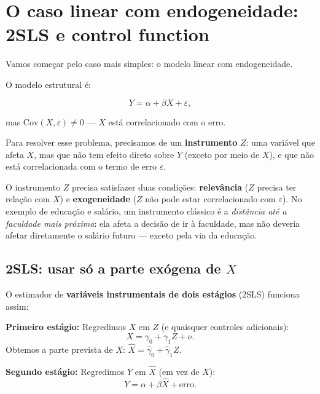 \chapter{O caso linear com endogeneidade: 2SLS e control function}

Vamos começar pelo caso mais simples: o modelo linear com endogeneidade.

O modelo estrutural é:

\begin{equation}
Y = \alpha + \beta X + \varepsilon,
\label{eq:structural}
\end{equation}

\noindent
mas $\mathrm{Cov}(X, \varepsilon) \neq 0$ --- $X$ está correlacionado com o erro.

Para resolver esse problema, precisamos de um \textbf{instrumento} $Z$: uma variável
que afeta $X$, mas que não tem efeito direto sobre $Y$ (exceto por meio de $X$), e que
não está correlacionada com o termo de erro $\varepsilon$.

\begin{destacebox}
O instrumento $Z$ precisa satisfazer duas condições: \textbf{relevância} ($Z$ precisa
ter relação com $X$) e \textbf{exogeneidade} ($Z$ não pode estar correlacionado com
$\varepsilon$). No exemplo de educação e salário, um instrumento clássico é a
\emph{distância até a faculdade mais próxima}: ela afeta a decisão de ir à faculdade,
mas não deveria afetar diretamente o salário futuro --- exceto pela via da educação.
\end{destacebox}

\section*{2SLS: usar só a parte exógena de $X$}

O estimador de \textbf{variáveis instrumentais de dois estágios} (2SLS) funciona assim:

\textbf{Primeiro estágio:} Regredimos $X$ em $Z$ (e quaisquer controles adicionais):
\begin{equation}
X = \gamma_0 + \gamma_1 Z + \nu.
\label{eq:first_stage}
\end{equation}
Obtemos a parte prevista de $X$: $\hat{X} = \hat{\gamma}_0 + \hat{\gamma}_1 Z$.

\textbf{Segundo estágio:} Regredimos $Y$ em $\hat{X}$ (em vez de $X$):
\begin{equation}
Y = \alpha + \beta \hat{X} + \text{erro}.
\end{equation}

